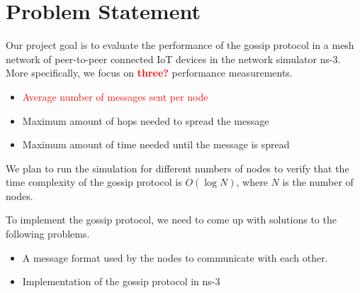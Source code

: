 \documentclass[journal]{IEEEtran}
\begin{document}

\section{Problem Statement}\label{sec:problem}

Our project goal is to evaluate the performance of the gossip protocol in a mesh network of peer-to-peer connected IoT devices in the network simulator ns-3. More specifically, we focus on \textcolor{red}{\textbf{three?}} performance measurements.
\begin{itemize}
 \item \textcolor{red}{ Average number of messages sent per node}
 \item Maximum amount of hops needed to spread the message
 \item Maximum amount of time needed until the message is spread
\end{itemize}

We plan to run the simulation for different numbers of nodes to verify that the time complexity of the gossip protocol is $O(\log N)$, where $N$ is the number of nodes.

To implement the gossip protocol, we need to come up with solutions to the following problems.
\begin{itemize}
 \item A message format used by the nodes to communicate with each other.
 \item Implementation of the gossip protocol in ns-3
\end{itemize}
\end{document}
